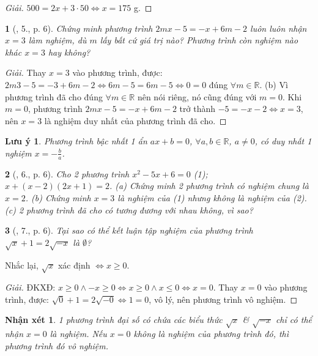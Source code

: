 \documentclass{article}
\newtheorem{baitoan}{}
\newtheorem{luuy}{Lưu ý}
\newtheorem{nhanxet}{Nhận xét}
\begin{document}
\begin{proof}[Giải]
	$500 = 2x + 3\cdot50\Leftrightarrow x = 175$ g.
\end{proof}

\begin{baitoan}[\cite{SBT_Toan_8_tap_2}, 5., p. 6]
	Chứng minh phương trình $2mx - 5 = -x + 6m - 2$ luôn luôn nhận $x = 3$ làm nghiệm, dù $m$ lấy bất cứ giá trị nào? Phương trình còn nghiệm nào khác $x = 3$ hay không?
\end{baitoan}

\begin{proof}[Giải]
	Thay $x = 3$ vào phương trình, được: $2m3 - 5 = -3 + 6m - 2\Leftrightarrow6m - 5 = 6m - 5\Leftrightarrow0 = 0$ đúng $\forall m\in\mathbb{R}$. (b) Vì phương trình đã cho đúng $\forall m\in\mathbb{R}$ nên nói riêng, nó cũng đúng với $m = 0$. Khi $m = 0$, phương trình $2mx - 5 = -x + 6m - 2$ trở thành $-5 = -x - 2\Leftrightarrow x = 3$, nên $x = 3$ là nghiệm duy nhất của phương trình đã cho.
\end{proof}

\begin{luuy}
	Phương trình bậc nhất 1 ẩn $ax + b = 0$, $\forall a,b\in\mathbb{R}$, $a\ne0$, có duy nhất 1 nghiệm $x = -\frac{b}{a}$.
\end{luuy}

\begin{baitoan}[\cite{SBT_Toan_8_tap_2}, 6., p. 6]
	Cho 2 phương trình $x^2 - 5x + 6 = 0$ (1); $x + (x - 2)(2x + 1) = 2$. (a) Chứng minh 2 phương trình có nghiệm chung là $x = 2$. (b) Chứng minh $x = 3$ là nghiệm của (1) nhưng không là nghiệm của (2). (c) 2 phương trình đã cho có tương đương với nhau không, vì sao?
\end{baitoan}

\begin{baitoan}[\cite{SBT_Toan_8_tap_2}, 7., p. 6]
	Tại sao có thể kết luận tập nghiệm của phương trình $\sqrt{x} + 1 = 2\sqrt{-x}$ là $\emptyset$?
\end{baitoan}
Nhắc lại, $\sqrt{x}$ xác định $\Leftrightarrow x\ge 0$.
\begin{proof}[Giải]
	ĐKXĐ: $x\ge 0\land-x\ge 0\Leftrightarrow x\ge 0\land x\le0\Leftrightarrow x = 0$. Thay $x = 0$ vào phương trình, được: $\sqrt{0} + 1 = 2\sqrt{-0}\Leftrightarrow 1 = 0$, vô lý, nên phương trình vô nghiệm.
\end{proof}

\begin{nhanxet}
	1 phương trình đại số có chứa các biểu thức $\sqrt{x}$ \& $\sqrt{-x}$ chỉ có thể nhận $x = 0$ là nghiệm. Nếu $x = 0$ không là nghiệm của phương trình đó, thì phương trình đó vô nghiệm.
\end{nhanxet}
\end{document}
